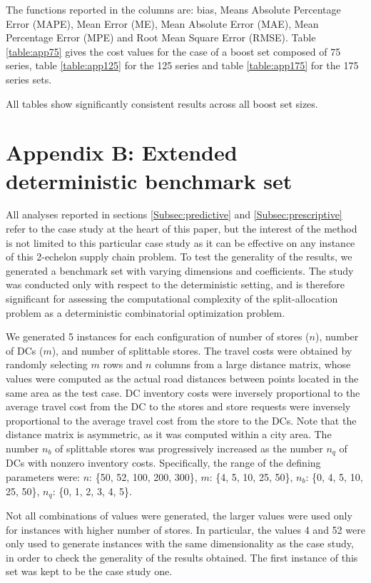 \documentclass[mnsc,sglanonrev]{informs4}  %
\theoremstyle{remark}\newtheorem{remark}{Remark}
\begin{document}
\begin{APPENDICES}
The functions reported in the columns are: bias, Means Absolute Percentage Error (MAPE), Mean Error (ME), Mean Absolute Error (MAE), Mean Percentage Error (MPE) and Root Mean Square Error (RMSE). Table \ref{table:app75} gives the cost values for the case of a boost set composed of 75 series, table \ref{table:app125} for the 125 series and table \ref{table:app175} for the 175 series sets.

All tables show significantly consistent results across all boost set sizes.

\section{Appendix B: Extended deterministic benchmark set} \label{app:artificial}

All analyses reported in sections \ref{Subsec:predictive} and \ref{Subsec:prescriptive} refer to the case study at the heart of this paper, but the interest of the method is not limited to this particular case study as it can be effective on any instance of this 2-echelon supply chain problem. To test the generality of the results, we generated a benchmark set with varying dimensions and coefficients. The study was conducted only with respect to the deterministic setting, and is therefore significant for assessing the computational complexity of the split-allocation problem as a deterministic combinatorial optimization problem.

We generated 5 instances for each configuration of number of stores ($n$), number of DCs ($m$), and number of splittable stores. The travel costs were obtained by randomly selecting $m$ rows and $n$ columns from a large distance matrix, whose values were computed as the actual road distances between points located in the same area as the test case. DC inventory costs were inversely proportional to the average travel cost from the DC to the stores and store requests were inversely proportional to the average travel cost from the store to the DCs. Note that the distance matrix is asymmetric, as it was computed within a city area. The number $n_b$ of splittable stores was progressively increased as the number $n_q$ of DCs with nonzero inventory costs. Specifically, the range of the defining parameters were: $n$: \{50, 52, 100, 200, 300\}, $m$: \{4, 5, 10, 25, 50\}, $n_b$: \{0, 4, 5, 10, 25, 50\}, $n_q$: \{0, 1, 2, 3, 4, 5\}.

Not all combinations of values were generated, the larger values were used only for instances with higher number of stores. In particular, the values 4 and 52 were only used to generate instances with the same dimensionality as the case study, in order to check the generality of the results obtained. The first instance of this set was kept to be the case study one.


\end{APPENDICES}
\end{document}
